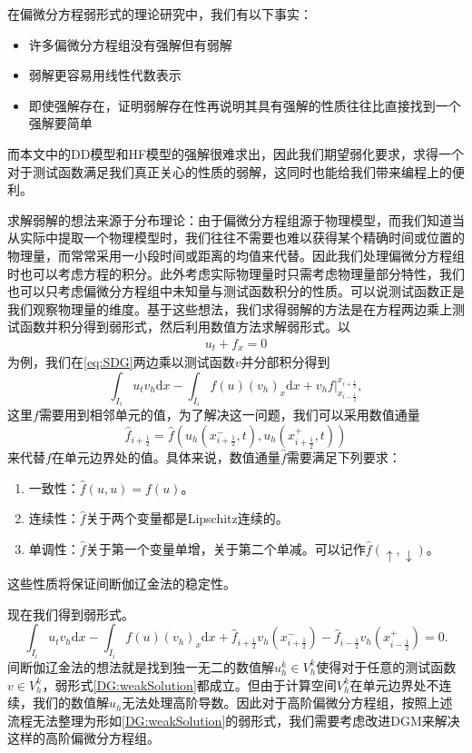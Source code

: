在偏微分方程弱形式的理论研究中，我们有以下事实\cite{sullivan2020brief}：
\begin{itemize}
	\item 许多偏微分方程组没有强解但有弱解
	\item 弱解更容易用线性代数表示
	\item 即使强解存在，证明弱解存在性再说明其具有强解的性质往往比直接找到一个强解要简单
\end{itemize}
而本文中的DD模型和HF模型的强解很难求出，因此我们期望弱化要求，求得一个对于测试函数满足我们真正关心的性质的弱解，这同时也能给我们带来编程上的便利。

求解弱解的想法来源于分布理论：由于偏微分方程组源于物理模型，而我们知道当从实际中提取一个物理模型时，我们往往不需要也难以获得某个精确时间或位置的物理量，而常常采用一小段时间或距离的均值来代替。因此我们处理偏微分方程组时也可以考虑方程的积分。此外考虑实际物理量时只需考虑物理量部分特性，我们也可以只考虑偏微分方程组中未知量与测试函数积分的性质。可以说测试函数正是我们观察物理量的维度。基于这些想法，我们求得弱解的方法是在方程两边乘上测试函数并积分得到弱形式，然后利用数值方法求解弱形式。以
\begin{align}
	u_t + f_x = 0\label{eq:SDG}
\end{align}
为例，我们在\eqref{eq:SDG}两边乘以测试函数$v$并分部积分得到
\begin{equation}
	\int_{I_i}u_t v_h\mathrm{d}x - \int_{I_i}f(u)(v_h)_x\mathrm{d}x+v_hf\bigg|^{x_{i+\frac{1}{2}}}_{x_{i-\frac{1}{2}}},
\end{equation}
这里$f$需要用到相邻单元的值，为了解决这一问题，我们可以采用数值通量
\begin{equation*}
	\hat{f}_{i+\frac{1}{2}}=\hat{f}(u_h(x^-_{i+\frac{1}{2}},t),u_h(x^+_{i+\frac{1}{2}},t))
\end{equation*}
来代替$f$在单元边界处的值。具体来说，数值通量$\hat{f}$需要满足下列要求：
\begin{enumerate}
	\item 一致性：$\hat{f}(u,u)=f(u)$。
	\item 连续性：$\hat{f}$关于两个变量都是Lipschitz连续的。
	\item 单调性：$\hat{f}$关于第一个变量单增，关于第二个单减。可以记作$\hat{f}(\uparrow,\downarrow)$。
\end{enumerate}
这些性质将保证间断伽辽金法的稳定性。

现在我们得到弱形式。
\begin{equation}
	\int_{I_i}u_t v_h\mathrm{d}x - \int_{I_i}f(u)(v_h)_x\mathrm{d}x+\hat{f}_{i+\frac{1}{2}}v_h(x^-_{i+\frac{1}{2}})-\hat{f}_{i-\frac{1}{2}}v_h(x^+_{i-\frac{1}{2}}) = 0. \label{DG:weakSolution}
\end{equation}
间断伽辽金法的想法就是找到独一无二的数值解$u_h^k\in V_h^k$使得对于任意的测试函数$v \in V_h^k$，弱形式\eqref{DG:weakSolution}都成立。但由于计算空间$V_h^k$在单元边界处不连续，我们的数值解$u_h$无法处理高阶导数。因此对于高阶偏微分方程组，按照上述流程无法整理为形如\eqref{DG:weakSolution}的弱形式，我们需要考虑改进DGM来解决这样的高阶偏微分方程组。
